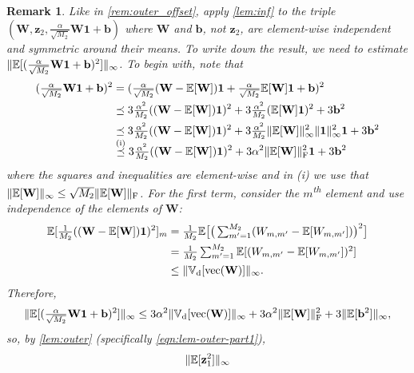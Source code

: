 \documentclass[twoside]{article}
\renewcommand{\ss}[1]{_{\text{#1}}}
\newcommand{\vb}{\mathbf{b}}
\newcommand{\vz}{\mathbf{z}}
\newcommand{\vone}{\mathbf{1}}
\newcommand{\mW}{\mathbf{W}}
\newcommand{\E}{\mathbb{E}}
\newcommand{\V}{\mathbb{V}}
\renewcommand{\ss}[1]{_{\text{#1}}}        %
\DeclarePairedDelimiter\norm{\|}{\|}             %
\theoremstyle{theoremstyle}
\newtheorem{remark}[theorem]{Remark}
\begin{document}
\begin{remark} \label{rem:inf_offset}
    Like in \cref{rem:outer_offset}, apply \cref{lem:inf} to the triple $(\mW, \vz_2, \tfrac{\alpha}{\sqrt{M_2}} \mW \vone + \vb)$ where $\mW$ and $\vb$, not $\vz_2$, are element-wise independent and symmetric around their means.
    To write down the result, we need to estimate $\norm{\E[(\tfrac{\alpha}{\sqrt{M_2}} \mW \vone + \vb)^2]}_\infty$.
    To begin with, note that
    \begin{align}
        (\tfrac{\alpha}{\sqrt{M_2}} \mW \vone + \vb)^2
        &= (\tfrac{\alpha}{\sqrt{M_2}} (\mW - \E[\mW]) \vone + \tfrac{\alpha}{\sqrt{M_2}} \E[\mW] \vone + \vb)^2 \\
        &\preceq 3\tfrac{\alpha^2}{M_2} ((\mW - \E[\mW]) \vone)^2 + 3\tfrac{\alpha^2}{M_2} (\E[\mW] \vone)^2 + 3 \vb^2 \\
        &\preceq 3\tfrac{\alpha^2}{M_2} ((\mW - \E[\mW]) \vone)^2 + 3\tfrac{\alpha^2}{M_2} \norm{\E[\mW]}_\infty^2 \norm{\vone}_\infty^2 \vone + 3 \vb^2 \\
        &\overset{\smash{\text{(i)}}}{\preceq} 3\tfrac{\alpha^2}{M_2} ((\mW - \E[\mW]) \vone)^2 + 3\alpha^2 \norm{\E[\mW]}\ss{F}^2 \vone + 3 \vb^2
    \end{align}
    where the squares and inequalities are element-wise and in (i) we use that $\norm{\E[\mW]}_\infty \le \sqrt{M_2} \norm{\E[\mW]}\ss{F}$.
    For the first term, consider the $m$\textsuperscript{th} element and use independence of the elements of $\mW$:
    \begin{align}
        \E[\tfrac{1}{M_2}((\mW - \E[\mW]) \vone)^2]_m
        &= \textstyle
            \tfrac{1}{M_2} \E\big[
                \big(\sum_{m'=1}^{M_2}(W_{m,m'} - \E[W_{m,m'}])\big)^2
            \big] \\
        &= \textstyle
            \tfrac{1}{M_2}
                \sum_{m'=1}^{M_2} \E[(W_{m,m'} - \E[W_{m,m'}])^2] \\
        &\le \norm{\V\ss{d}[\operatorname{vec}(\mW)]}_{\infty}.
    \end{align}
    Therefore, 
    \begin{equation}
        \norm{\E[(\tfrac{\alpha}{\sqrt{M_2}} \mW \vone + \vb)^2]}_\infty
        \le 3 \alpha^2 \norm{\V\ss{d}[\operatorname{vec}(\mW)]}_{\infty} + 3 \alpha^2 \norm{\E[\mW]}\ss{F}^2 + 3 \norm{\E[\vb^2]}_\infty,
    \end{equation}
    so, by \cref{lem:outer} (specifically \cref{eqn:lem-outer-part1}),
    \begin{align}
        &\norm{\E[\vz_{1}^2]}_\infty \nonumber \\

\end{align}
\end{remark}
\end{document}

